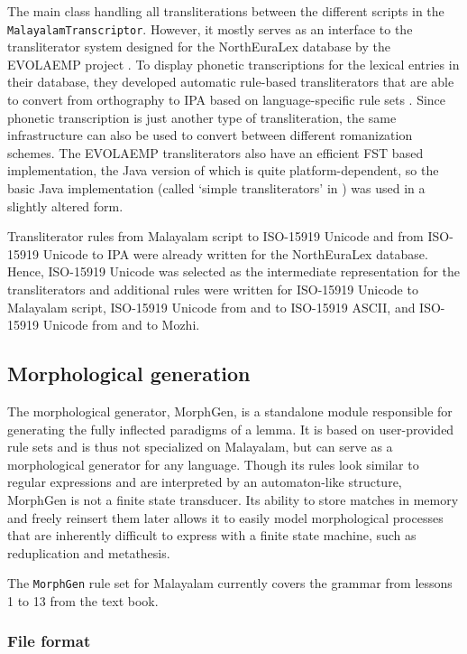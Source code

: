 \documentclass[a4paper]{article}
\newcommand{\typ}[1]{\texttt{#1}}
\begin{document}
The main class handling all transliterations between the different scripts in the \typ{MalayalamTranscriptor}. However, it mostly serves as an interface to the transliterator system designed for the NorthEuraLex database by the EVOLAEMP project \parencite{northeuralex}. To display phonetic transcriptions for the lexical entries in their database, they developed automatic rule-based transliterators that are able to convert from orthography to IPA based on language-specific rule sets \parencite{daneyko2016translit}. Since phonetic transcription is just another type of transliteration, the same infrastructure can also be used to convert between different romanization schemes. The EVOLAEMP transliterators also have an efficient FST based implementation, the Java version of which is quite platform-dependent, so the basic Java implementation (called `simple transliterators' in \textcite{daneyko2016translit}) was used in a slightly altered form.

Transliterator rules from Malayalam script to ISO-15919 Unicode and from ISO-15919 Unicode to IPA were already written for the NorthEuraLex database. Hence, ISO-15919 Unicode was selected as the intermediate representation for the transliterators and additional rules were written for ISO-15919 Unicode to Malayalam script, ISO-15919 Unicode from and to ISO-15919 ASCII, and ISO-15919 Unicode from and to Mozhi.


\subsection{Morphological generation}

The morphological generator, MorphGen, is a standalone module responsible for generating the fully inflected paradigms of a lemma. It is based on user-provided rule sets and is thus not specialized on Malayalam, but can serve as a morphological generator for any language. Though its rules look similar to regular expressions and are interpreted by an automaton-like structure, MorphGen is not a finite state transducer. Its ability to store matches in memory and freely reinsert them later allows it to easily model morphological processes that are inherently difficult to express with a finite state machine, such as reduplication and metathesis.

The \typ{MorphGen} rule set for Malayalam currently covers the grammar from lessons 1 to 13 from the \textcite{moag} text book.

\subsubsection{File format}
\end{document}
